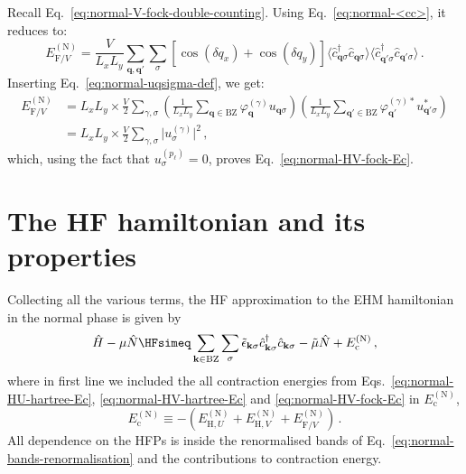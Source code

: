 \begin{tabproof}

	Recall Eq.~\eqref{eq:normal-V-fock-double-counting}. Using Eq.~\eqref{eq:normal-<cc>}, it reduces to:
	\[
		E_{\mathrm{F}/V}^{(\mathrm{N})} = \frac{V}{L_x L_y} \sum_{ \mathbf{q}, \mathbf{q}'} \sum_\sigma \left[
		\cos \left(
		\delta q_x
		\right)	+ \cos \left(
		\delta q_y
		\right)	
		\right]	
		\langle
		\hat c_{\mathbf{q} \sigma}^\dagger \hat c_{\mathbf{q} \sigma}
		\rangle \langle
		\hat c_{\mathbf{q}' \sigma}^\dagger  \hat c_{\mathbf{q}' \sigma}
		\rangle \, .
	\]
	Inserting Eq.~\eqref{eq:normal-uqsigma-def}, we get:
	\[
	\begin{aligned}
		E_{\mathrm{F}/V}^{(\mathrm{N})} &= L_x L_y \times \frac{V}{2} \sum_{\gamma,\sigma} \left(
		\frac{1}{L_x L_y} \sum_{\mathbf{q}\in\mathrm{BZ}} \varphi_\mathbf{q}^{(\gamma)} u_{\mathbf{q}\sigma}
		\right) \left(
		\frac{1}{L_x L_y} \sum_{\mathbf{q}'\in\mathrm{BZ}} \varphi_{\mathbf{q}'}^{(\gamma)*} u_{\mathbf{q}'\sigma}^*
		\right) \\
		&= L_x L_y \times \frac{V}{2} \sum_{\gamma,\sigma}
		\big|
			u_\sigma^{(\gamma)}
		\big|^2 \, ,
	\end{aligned}
	\]
	which, using the fact that $u_\sigma^{(p_\ell)}=0$, proves Eq.~\eqref{eq:normal-HV-fock-Ec}.
\end{tabproof}

\section{The HF hamiltonian and its properties}\label{sec:normal-hf-hamiltonian}

Collecting all the various terms, the HF approximation to the EHM hamiltonian in the normal phase is given by
\begin{equation}\label{eq:normal-Hhf}
	\hat H - \mu \hat N \HFsimeq \sum_{\mathbf{k} \in \mathrm{BZ}} \sum_\sigma \tilde{\epsilon}_{\mathbf{k}\sigma}
	\hat c_{\mathbf{k}\sigma}^\dagger \hat c_{\mathbf{k}\sigma} - \tilde{\mu} \hat N + E_\mathrm{c}^{(\mathrm{N})} \, ,
\end{equation}
where in first line we included the all contraction energies from Eqs.~\eqref{eq:normal-HU-hartree-Ec}, \eqref{eq:normal-HV-hartree-Ec} and \eqref{eq:normal-HV-fock-Ec} in $E_\mathrm{c}^{(\mathrm{N})}$,
\begin{equation}\label{eq:normal-Ec}
	E_\mathrm{c}^{(\mathrm{N})} \equiv
	-\left(
	E_{\mathrm{H},U}^{(\mathrm{N})} + E_{\mathrm{H},V}^{(\mathrm{N})} +  E_{\mathrm{F}/V}^{(\mathrm{N})}
	\right) \, .
\end{equation}
All dependence on the HFPs is inside the renormalised bands of Eq.~\eqref{eq:normal-bands-renormalisation} and the contributions to contraction energy.

